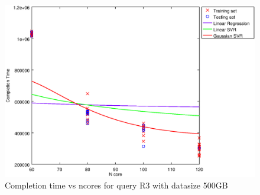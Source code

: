 
\begin {figure}[hbtp]
\centering
\includegraphics[width=\textwidth]{output/R3_500_1_OVER_NCORES/plot_R3_500_bestmodels.eps}
\caption{Completion time vs ncores for query R3 with datasize 500GB}
\label{fig:all_nonlinear_R3_500}
\end {figure}
